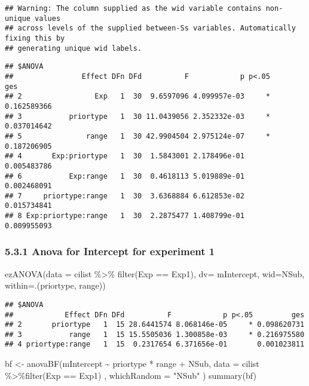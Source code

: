 \documentclass[
]{article}
\newenvironment{Shaded}{\begin{snugshade}}{\end{snugshade}}
\newcommand{\AttributeTok}[1]{\textcolor[rgb]{0.77,0.63,0.00}{#1}}
\newcommand{\FunctionTok}[1]{\textcolor[rgb]{0.00,0.00,0.00}{#1}}
\newcommand{\NormalTok}[1]{#1}
\newcommand{\OtherTok}[1]{\textcolor[rgb]{0.56,0.35,0.01}{#1}}
\newcommand{\SpecialCharTok}[1]{\textcolor[rgb]{0.00,0.00,0.00}{#1}}
\newcommand{\StringTok}[1]{\textcolor[rgb]{0.31,0.60,0.02}{#1}}
\begin{document}
\begin{verbatim}
## Warning: The column supplied as the wid variable contains non-unique values
## across levels of the supplied between-Ss variables. Automatically fixing this by
## generating unique wid labels.
\end{verbatim}

\begin{verbatim}
## $ANOVA
##                Effect DFn DFd          F            p p<.05         ges
## 2                 Exp   1  30  9.6597096 4.099957e-03     * 0.162589366
## 3           priortype   1  30 11.0439056 2.352332e-03     * 0.037014642
## 5               range   1  30 42.9904504 2.975124e-07     * 0.187206905
## 4       Exp:priortype   1  30  1.5843001 2.178496e-01       0.005483786
## 6           Exp:range   1  30  0.4618113 5.019889e-01       0.002468091
## 7     priortype:range   1  30  3.6368884 6.612853e-02       0.015734841
## 8 Exp:priortype:range   1  30  2.2875477 1.408799e-01       0.009955093
\end{verbatim}

\hypertarget{anova-for-intercept-for-experiment-1}{%
\subsubsection{5.3.1 Anova for Intercept for experiment
1}\label{anova-for-intercept-for-experiment-1}}

\begin{Shaded}
\begin{Highlighting}[]
\FunctionTok{ezANOVA}\NormalTok{(}\AttributeTok{data =}\NormalTok{ cilist }\SpecialCharTok{\%\textgreater{}\%} \FunctionTok{filter}\NormalTok{(Exp }\SpecialCharTok{==} \StringTok{\textquotesingle{}Exp1\textquotesingle{}}\NormalTok{), }\AttributeTok{dv=}\NormalTok{ mIntercept, }\AttributeTok{wid=}\NormalTok{NSub, }\AttributeTok{within=}\NormalTok{.(priortype, range))}
\end{Highlighting}
\end{Shaded}

\begin{verbatim}
## $ANOVA
##            Effect DFn DFd          F            p p<.05         ges
## 2       priortype   1  15 28.6441574 8.068146e-05     * 0.098620731
## 3           range   1  15 15.5505036 1.300858e-03     * 0.216975580
## 4 priortype:range   1  15  0.2317654 6.371656e-01       0.001023811
\end{verbatim}

\begin{Shaded}
\begin{Highlighting}[]
\NormalTok{bf }\OtherTok{\textless{}{-}} \FunctionTok{anovaBF}\NormalTok{(mIntercept }\SpecialCharTok{\textasciitilde{}}\NormalTok{ priortype }\SpecialCharTok{*}\NormalTok{ range }\SpecialCharTok{+}\NormalTok{ NSub, }\AttributeTok{data =}\NormalTok{ cilist }\SpecialCharTok{\%\textgreater{}\%}\FunctionTok{filter}\NormalTok{(Exp }\SpecialCharTok{==} \StringTok{\textquotesingle{}Exp1\textquotesingle{}}\NormalTok{) , }\AttributeTok{whichRandom =} \StringTok{"NSub"}\NormalTok{ ) }
\FunctionTok{summary}\NormalTok{(bf)}
\end{Highlighting}
\end{Shaded}
\end{document}
